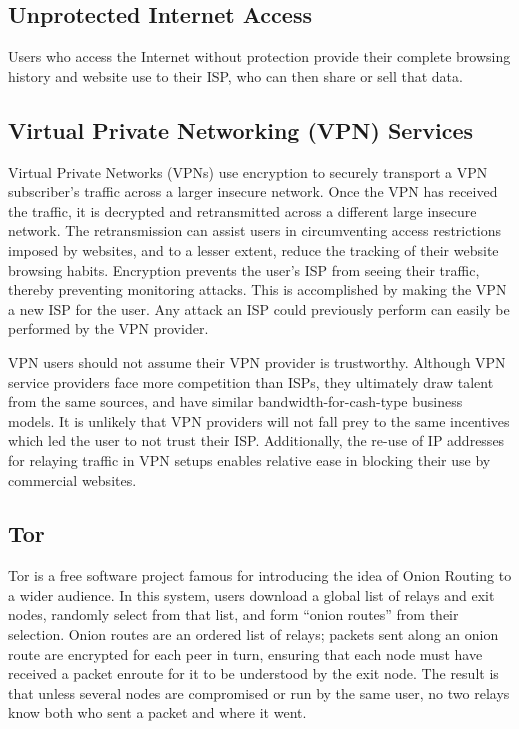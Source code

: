 
\subsection{Unprotected Internet Access}

Users who access the Internet without protection provide their
complete browsing history and website use to their ISP, who can then share or sell that data.

\subsection{Virtual Private Networking (VPN) Services}

Virtual Private Networks (VPNs) use encryption to securely transport a
VPN subscriber's traffic across a larger insecure network. Once the
VPN has received the traffic, it is decrypted and retransmitted across
a different large insecure network. The retransmission can assist
users in circumventing access restrictions imposed by websites, and to
a lesser extent, reduce the tracking of their website browsing habits. Encryption prevents the user's ISP from seeing their
traffic, thereby preventing monitoring attacks. This is accomplished by making the VPN a new ISP for the user.  Any attack an ISP could previously perform can easily be performed by the VPN provider.

VPN users should not assume their VPN provider is trustworthy. Although VPN service providers face more competition
than ISPs, they ultimately draw talent from the same sources, and have
similar bandwidth-for-cash-type business models. It is unlikely that
VPN providers will not fall prey to the same incentives which led the
user to not trust their ISP. Additionally, the re-use of IP addresses
for relaying traffic in VPN setups enables relative ease in blocking
their use by commercial websites\cite{13}.

\subsection{Tor}

Tor\cite{TOR} is a free software project famous for introducing the
idea of Onion Routing to a wider audience. In this system, users
download a global list of relays and exit nodes, randomly select from that list, and form ``onion routes'' from their selection. Onion routes are an ordered list of relays; packets sent along an onion route are
encrypted for each peer in turn, ensuring that each node must have
received a packet enroute for it to be understood by the exit node. The result is that unless several nodes are
compromised or run by the same user, no two relays know both who sent
a packet and where it went.

